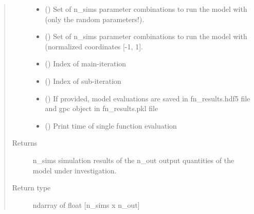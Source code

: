 \documentclass[letterpaper,10pt,english,openany,oneside]{sphinxmanual}
\begin{document}
\begin{fulllineitems}
\begin{fulllineitems}
\begin{quote}
\begin{description}
\begin{itemize}
\item {} 
 (\sphinxstyleliteralemphasis{\sphinxupquote{ {[}}}\sphinxstyleliteralemphasis{\sphinxupquote{, }}\sphinxstyleliteralemphasis{\sphinxupquote{{]}}}) \textendash{} Set of n\_sims parameter combinations to run the model with (only the random parameters!).

\item {} 
 (\sphinxstyleliteralemphasis{\sphinxupquote{ {[}}}\sphinxstyleliteralemphasis{\sphinxupquote{, }}\sphinxstyleliteralemphasis{\sphinxupquote{{]}}}) \textendash{} Set of n\_sims parameter combinations to run the model with (normalized coordinates {[}-1, 1{]}.

\item {} 
 () \textendash{} Index of main-iteration

\item {} 
 () \textendash{} Index of sub-iteration

\item {} 
 (\sphinxstyleliteralemphasis{\sphinxupquote{, }}\sphinxstyleliteralemphasis{\sphinxupquote{, }}) \textendash{} If provided, model evaluations are saved in fn\_results.hdf5 file and gpc object in fn\_results.pkl file

\item {} 
 () \textendash{} Print time of single function evaluation

\end{itemize}

\item[{Returns}] \leavevmode
{} \textendash{} n\_sims simulation results of the n\_out output quantities of the model under investigation.

\item[{Return type}] \leavevmode
ndarray of float {[}n\_sims x n\_out{]}

\end{description}\end{quote}

\end{fulllineitems}


\end{fulllineitems}
\end{document}
